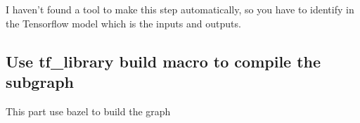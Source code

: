 \documentclass[11pt,openany]{book}
\begin{document}
I haven't found a tool to make this step automatically, so you have to identify in the Tensorflow model which is the inputs and outputs.

\subsection{Use tf_library build macro to compile the subgraph}

This part use bazel to build the graph

\appendix %
\printnotes*
\end{document}
